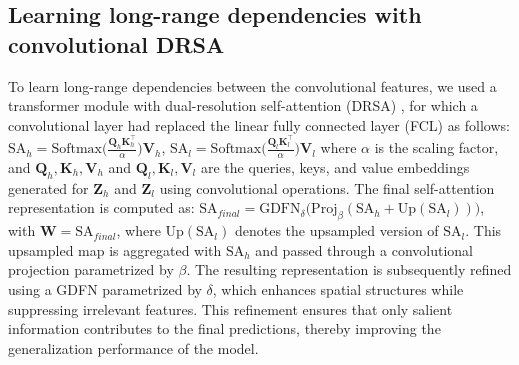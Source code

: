 \documentclass[runningheads]{llncs}
\begin{document}
    \subsection{Learning long-range dependencies with convolutional DRSA}
        \label{drsa}        
        To learn long-range dependencies between the convolutional features, we used a transformer module with dual-resolution self-attention (DRSA) \cite{ilyas2024hybrid}, for which a convolutional layer had replaced the linear fully connected layer (FCL) \cite{wu2021cvt} as follows: $\text{SA}_h = \text{Softmax} \big( \frac{\mathbf{Q}_h \mathbf{K}^\top_h}{\alpha} \big) \mathbf{V}_h$, $\text{SA}_l = \text{Softmax} \big( \frac{\mathbf{Q}_l \mathbf{K}^\top_l}{\alpha} \big) \mathbf{V}_l$ where $\alpha$ is the scaling factor, and $\mathbf{Q}_h, \mathbf{K}_h, \mathbf{V}_h$ and $\mathbf{Q}_l, \mathbf{K}_l, \mathbf{V}_l$ are the queries, keys, and value embeddings generated for $\mathbf{Z}_h$ and $\mathbf{Z}_l$ using convolutional operations. 
        The final self-attention representation is computed as: $\text{SA}_{final} = \text{GDFN}_\delta \big(\text{Proj}_\beta(\text{SA}_h +  \text{Up}(\text{SA}_l)) \big)$, with $\mathbf{W} = \text{SA}_{final}$, where $\text{Up}(\text{SA}_l)$ denotes the upsampled version of $\text{SA}_l$. This upsampled map is aggregated with $\text{SA}_h$ and passed through a convolutional projection parametrized by $\beta$. 
        The resulting representation is subsequently refined using a GDFN parametrized by $\delta$, which enhances spatial structures while suppressing irrelevant features. This refinement ensures that only salient information contributes to the final predictions, thereby improving the generalization performance of the model.    
\end{document}
